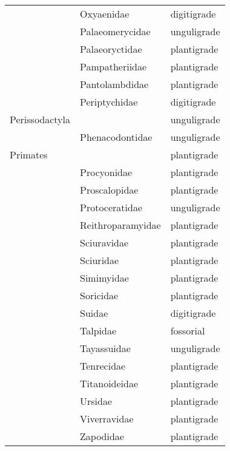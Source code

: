 \begin{table}[ht]
\begin{tabular}{lll}
   & Oxyaenidae & digitigrade \\ 
   & Palaeomerycidae & unguligrade \\ 
   & Palaeoryctidae & plantigrade \\ 
   & Pampatheriidae & plantigrade \\ 
   & Pantolambdidae & plantigrade \\ 
   & Periptychidae & digitigrade \\ 
  Perissodactyla &  & unguligrade \\ 
   & Phenacodontidae & unguligrade \\ 
  Primates &  & plantigrade \\ 
   & Procyonidae & plantigrade \\ 
   & Proscalopidae & plantigrade \\ 
   & Protoceratidae & unguligrade \\ 
   & Reithroparamyidae & plantigrade \\ 
   & Sciuravidae & plantigrade \\ 
   & Sciuridae & plantigrade \\ 
   & Simimyidae & plantigrade \\ 
   & Soricidae & plantigrade \\ 
   & Suidae & digitigrade \\ 
   & Talpidae & fossorial \\ 
   & Tayassuidae & unguligrade \\ 
   & Tenrecidae & plantigrade \\ 
   & Titanoideidae & plantigrade \\ 
   & Ursidae & plantigrade \\ 
   & Viverravidae & plantigrade \\ 
   & Zapodidae & plantigrade \\ 
   \hline
\end{tabular}
\end{table}
